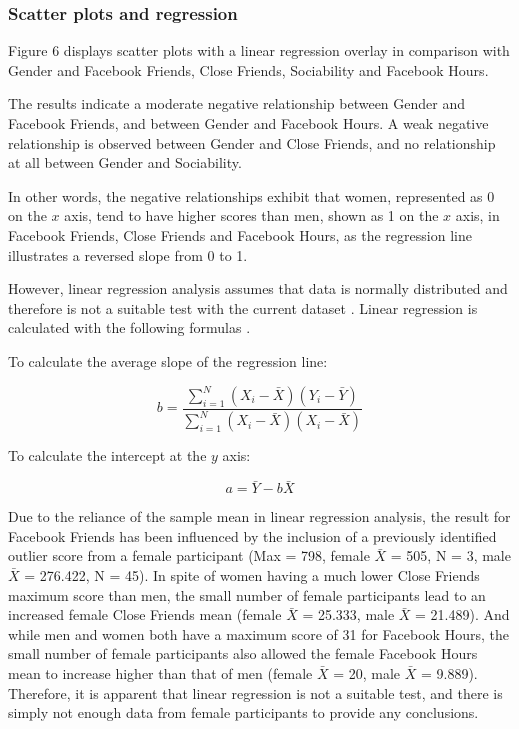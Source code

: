
\subsubsection{Scatter plots and regression}

Figure 6 displays scatter plots with a linear regression overlay in comparison with Gender and Facebook Friends, Close Friends, Sociability and Facebook Hours.

The results indicate a moderate negative relationship between Gender and Facebook Friends, and between Gender and Facebook Hours. A weak negative relationship is observed between Gender and Close Friends, and no relationship at all between Gender and Sociability.

In other words, the negative relationships exhibit that women, represented as 0 on the $x$ axis, tend to have higher scores than men, shown as 1 on the $x$ axis, in Facebook Friends, Close Friends and Facebook Hours, as the regression line illustrates a reversed slope from 0 to 1.

However, linear regression analysis assumes that data is normally distributed and therefore is not a suitable test with the current dataset \citep[p. 263]{McKillup2011}. Linear regression is calculated with the following formulas \citep[p. 247-249]{McKillup2011}.\\
\linebreak

To calculate the average slope of the regression line:
 
$$b = \frac{\sum_{i=1}^N(X_i - \bar{X})(Y_i - \bar{Y})}{\sum_{i=1}^N(X_i - \bar{X})(X_i - \bar{X})}$$ \linebreak

To calculate the intercept at the $y$ axis:

$$a = \bar{Y} - b\bar{X}$$ \linebreak

Due to the reliance of the sample mean in linear regression analysis, the result for Facebook Friends has been influenced by the inclusion of a previously identified outlier score from a female participant (Max = 798, female $\bar{X}$ = 505, N = 3, male $\bar{X}$ = 276.422, N = 45). In spite of women having a much lower Close Friends maximum score than men, the small number of female participants lead to an increased female Close Friends mean (female $\bar{X}$ = 25.333, male $\bar{X}$ = 21.489). And while men and women both have a maximum score of 31 for Facebook Hours, the small number of female participants also allowed the female Facebook Hours mean to increase higher than that of men (female $\bar{X}$ = 20, male $\bar{X}$ = 9.889). Therefore, it is apparent that linear regression is not a suitable test, and there is simply not enough data from female participants to provide any conclusions.

